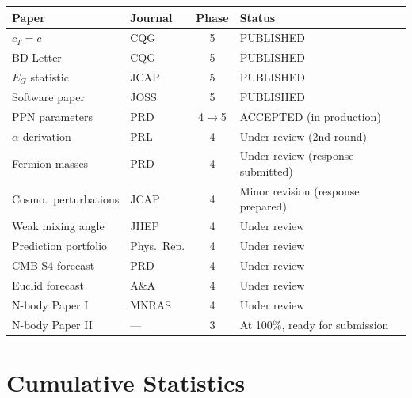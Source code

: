 \documentclass[11pt,a4paper]{article}
\begin{document}
\begin{center}
\begin{longtable}{p{4.5cm}lcl}
\toprule
\textbf{Paper} & \textbf{Journal} & \textbf{Phase} & \textbf{Status} \\
\midrule
\endhead
$c_T = c$ & CQG & 5 & PUBLISHED \\
BD Letter & CQG & 5 & PUBLISHED \\
$E_G$ statistic & JCAP & 5 & PUBLISHED \\
Software paper & JOSS & 5 & PUBLISHED \\
PPN parameters & PRD & 4$\to$5 & ACCEPTED (in production) \\
$\alpha$ derivation & PRL & 4 & Under review (2nd round) \\
Fermion masses & PRD & 4 & Under review (response submitted) \\
Cosmo.\ perturbations & JCAP & 4 & Minor revision (response prepared) \\
Weak mixing angle & JHEP & 4 & Under review \\
Prediction portfolio & Phys.\ Rep. & 4 & Under review \\
CMB-S4 forecast & PRD & 4 & Under review \\
Euclid forecast & A\&A & 4 & Under review \\
N-body Paper I & MNRAS & 4 & Under review \\
N-body Paper II & --- & 3 & At 100\%, ready for submission \\
\bottomrule
\end{longtable}
\end{center}

\section{Cumulative Statistics}
\end{document}
